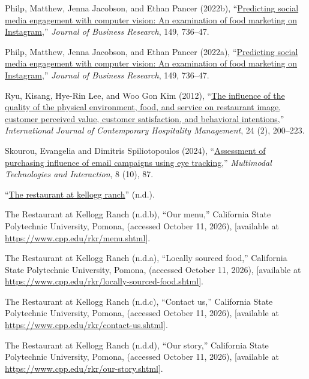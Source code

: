 \documentclass[
  12pt,
  letterpaper,
  DIV=11,
  numbers=noendperiod]{scrartcl}
\newlength{\cslhangindent}
\newenvironment{CSLReferences}[2] %
 {\begin{list}{}{%
  \setlength{\itemindent}{0pt}
  \setlength{\leftmargin}{0pt}
  \setlength{\parsep}{0pt}
  \ifodd #1
   \setlength{\leftmargin}{\cslhangindent}
   \setlength{\itemindent}{-1\cslhangindent}
  \fi
  \setlength{\itemsep}{#2\baselineskip}}}
 {\end{list}}
\begin{document}
\begin{CSLReferences}{1}{0}
Philp, Matthew, Jenna Jacobson, and Ethan Pancer (2022b),
{``\href{https://doi.org/10.1016/j.jbusres.2022.05.078}{Predicting
social media engagement with computer vision: An examination of food
marketing on Instagram},''} \emph{Journal of Business Research}, 149,
736--47.

Philp, Matthew, Jenna Jacobson, and Ethan Pancer (2022a),
{``\href{https://doi.org/10.1016/j.jbusres.2022.05.078}{Predicting
social media engagement with computer vision: An examination of food
marketing on Instagram},''} \emph{Journal of Business Research}, 149,
736--47.

Ryu, Kisang, Hye-Rin Lee, and Woo Gon Kim (2012),
{``\href{https://doi.org/10.1108/09596111211206141}{The influence of the
quality of the physical environment, food, and service on restaurant
image, customer perceived value, customer satisfaction, and behavioral
intentions},''} \emph{International Journal of Contemporary Hospitality
Management}, 24 (2), 200--223.

Skourou, Evangelia and Dimitris Spiliotopoulos (2024),
{``\href{https://doi.org/10.3390/mti8100087}{Assessment of purchasing
influence of email campaigns using eye tracking},''} \emph{Multimodal
Technologies and Interaction}, 8 (10), 87.

{``\href{https://www.cpp.edu/rkr/}{The restaurant at kellogg ranch}''}
(n.d.).

The Restaurant at Kellogg Ranch (n.d.b), {``Our menu,''} California
State Polytechnic University, Pomona, (accessed October 11, 2026),
{[}available at \url{https://www.cpp.edu/rkr/menu.shtml}{]}.

The Restaurant at Kellogg Ranch (n.d.a), {``Locally sourced food,''}
California State Polytechnic University, Pomona, (accessed October 11,
2026), {[}available at
\url{https://www.cpp.edu/rkr/locally-sourced-food.shtml}{]}.

The Restaurant at Kellogg Ranch (n.d.c), {``Contact us,''} California
State Polytechnic University, Pomona, (accessed October 11, 2026),
{[}available at \url{https://www.cpp.edu/rkr/contact-us.shtml}{]}.

The Restaurant at Kellogg Ranch (n.d.d), {``Our story,''} California
State Polytechnic University, Pomona, (accessed October 11, 2026),
{[}available at \url{https://www.cpp.edu/rkr/our-story.shtml}{]}.


\end{CSLReferences}
\end{document}
